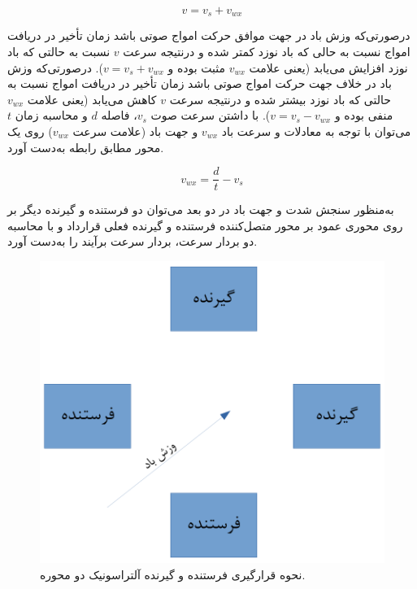 \begin{equation}\label{eq:expandSpeed}
v = v_s + v_{wx}
\end{equation}

درصورتی‌که وزش باد در جهت موافق حرکت امواج صوتی باشد زمان تأخیر در دریافت امواج نسبت به حالی که باد نوزد کمتر شده و درنتیجه سرعت $v$ نسبت به حالتی که باد نوزد افزایش می‌یابد (یعنی علامت $v_{wx}$ مثبت بوده و $v = v_s+v_{wx}$). درصورتی‌که وزش باد در خلاف جهت حرکت امواج صوتی باشد زمان تأخیر در دریافت امواج نسبت به حالتی که باد نوزد بیشتر شده و درنتیجه سرعت $v$ کاهش می‌یابد (یعنی علامت $v_{wx}$ منفی بوده و $v = v_s-v_{wx}$). با داشتن سرعت صوت $v_s$، فاصله $d$ و محاسبه زمان $t$ می‌توان با توجه به معادلات  و  سرعت باد $v_{wx}$ و جهت باد (علامت سرعت $v_{wx}$) روی یک محور مطابق رابطه  به‌دست آورد. 

\begin{equation}\label{eq:speedWindX}
v_{wx} = \frac{d}{t} - v_s
\end{equation}

به‌منظور سنجش شدت و جهت باد در دو بعد می‌توان دو فرستنده و گیرنده دیگر بر روی محوری عمود بر محور متصل‌کننده فرستنده و گیرنده فعلی قرارداد و با محاسبه دو بردار سرعت، بردار سرعت برآیند را به‌دست آورد.
\begin{figure}[!h]
	\centering
	\includegraphics[width=0.7\linewidth]{Assets/ultrasonic 2d.pdf}
	\caption{نحوه قرارگیری فرستنده و گیرنده آلتراسونیک دو محوره.}
	\label{fig:2dUltrasonic}
\end{figure}

